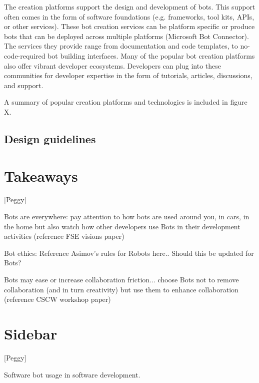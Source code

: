 \documentclass{sig-alternate}
\begin{document}
	The creation platforms support the design and development of bots. This support often comes in the form of software foundations (e.g. frameworks, tool kits, APIs, or other services). These bot creation services can be platform specific or produce bots that can be deployed across multiple platforms (Microsoft Bot Connector). The services they provide range from documentation and code templates, to no-code-required bot building interfaces. 
	Many of the popular bot creation platforms also offer vibrant developer ecosystems. Developers can plug into these communities for developer expertise in the form of tutorials, articles, discussions, and support.

	A summary of popular creation platforms and technologies is included in figure X.

	\subsection{Design guidelines}


\section{Takeaways}

[Peggy]

	Bots are everywhere: pay attention to how bots are used around you, in cars, in the home but also watch how other developers use Bots in their development activities (reference FSE visions paper)
	
	Bot ethics:  Reference Asimov's rules for Robots here..   Should this be updated for Bots?
	
	Bots may ease or increase collaboration friction...  choose Bots not to remove collaboration (and in turn creativity) but use them to enhance collaboration (reference CSCW workshop paper)



\section{Sidebar}

[Peggy]

Software bot usage in software development.




%



%


%

\listoftodos
%
%
\end{document}
